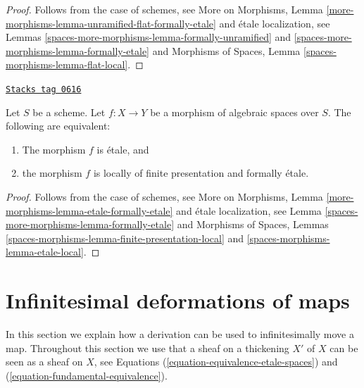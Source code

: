 \begin{proof}
Follows from the case of schemes, see
More on Morphisms,
Lemma \ref{more-morphisms-lemma-unramified-flat-formally-etale}
and \'etale localization, see
Lemmas \ref{spaces-more-morphisms-lemma-formally-unramified} and \ref{spaces-more-morphisms-lemma-formally-etale}
and
Morphisms of Spaces, Lemma \ref{spaces-morphisms-lemma-flat-local}.
\end{proof}

\begin{lemma}
\label{spaces-more-morphisms-lemma-etale-formally-etale}
\href{https://stacks.math.columbia.edu/tag/0616}{\texttt{Stacks tag 0616}}

Let $S$ be a scheme.
Let $f : X \to Y$ be a morphism of algebraic spaces over $S$.
The following are equivalent:
\begin{enumerate}
\item The morphism $f$ is \'etale, and
\item the morphism $f$ is locally of finite presentation and
formally \'etale.
\end{enumerate}
\end{lemma}

\begin{proof}
Follows from the case of schemes, see
More on Morphisms,
Lemma \ref{more-morphisms-lemma-etale-formally-etale}
and \'etale localization, see
Lemma \ref{spaces-more-morphisms-lemma-formally-etale}
and
Morphisms of Spaces,
Lemmas \ref{spaces-morphisms-lemma-finite-presentation-local} and
\ref{spaces-morphisms-lemma-etale-local}.
\end{proof}

\section{Infinitesimal deformations of maps}
\label{spaces-more-morphisms-section-action-by-derivations}
In this section we explain how a derivation can be used to
infinitesimally move a map. Throughout this section we use that
a sheaf on a thickening $X'$ of $X$ can be seen as a sheaf on $X$, see
Equations (\ref{equation-equivalence-etale-spaces}) and
(\ref{equation-fundamental-equivalence}).

